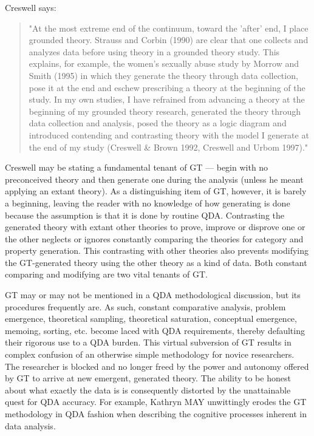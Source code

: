 Creswell
\citep[p. 86]{book.creswell98}
says:
\begin{quote}
"At the most extreme end of the continuum, toward the 'after' end, I
place grounded theory. 
Strauss and Corbin (1990) are clear that one collects and analyzes data before using theory in a grounded theory study. 
This explains, for example, the women's sexually abuse study by
Morrow and Smith (1995) in which they generate the theory through
data collection, pose it at the end and eschew prescribing a theory at
the beginning of the study. 
In my own studies, I have refrained from
advancing a theory at the beginning of my grounded theory research,
generated the theory through data collection and analysis, posed the
theory as a logic diagram and introduced contending and contrasting
theory with the model I generate at the end of my study 
(Creswell \& Brown 1992, Creswell and Urbom 1997)."
\end{quote}

Creswell may be stating a fundamental tenant of GT --- begin with no
preconceived theory and then generate one during the analysis (unless he meant applying an extant theory). 
As a distinguishing item of GT, however, it is barely a beginning, leaving the reader with no knowledge of how generating is done because the assumption is that it is done by routine QDA. 
Contrasting the generated theory with extant other theories to prove, improve or disprove one or the other neglects or ignores constantly comparing the theories for category and property generation. 
This contrasting with other theories also prevents modifying the GT-generated theory using the other theory as a kind of data.
Both constant comparing and modifying are two vital tenants of GT.

GT may or may not be mentioned in a QDA methodological discussion, 
but its procedures frequently are. 
As such, constant comparative analysis, problem emergence, theoretical sampling, theoretical saturation, conceptual emergence, memoing, sorting, etc. become laced with QDA requirements, thereby defaulting
their rigorous use to a QDA burden. 
This virtual subversion of GT results in complex confusion of an otherwise simple methodology for novice researchers.
The researcher is blocked and no longer freed by the power and autonomy offered by GT to arrive at new emergent, generated theory. 
The ability to be honest about what exactly the data is is consequently distorted by the unattainable quest for QDA accuracy. 
For example, Kathryn MAY unwittingly erodes the GT methodology in QDA fashion when describing the cognitive processes inherent in data analysis.

